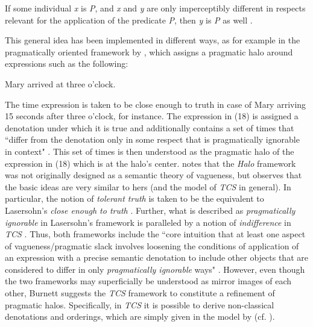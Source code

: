 \documentclass[output=paper]{langsci/langscibook}
\begin{document}
\ea
	If some individual \textit{x} is \textit{P}, and \textit{x} and \textit{y} are only imperceptibly different in respects relevant for the application of the predicate \textit{P}, then \textit{y} is \textit{P} as well \textcite[348]{Cobreros2012}.
\z

This general idea has been implemented in different ways, as for example in the pragmatically oriented framework by \citet{Lasersohn1999}, which assigns a pragmatic halo around expressions such as the following:

\ea
	Mary arrived at three o'clock.
\z

The time expression is taken to be close enough to truth in case of Mary arriving 15 seconds after three o'clock, for instance. The expression in (18) is assigned a denotation under which it is true and additionally contains a set of times that ``differ from the denotation only in some respect that is pragmatically ignorable in context" \textcite[526]{Lasersohn1999}. This set of times is then understood as the pragmatic halo of the expression in (18) which is at the halo's center. \textcite[29]{Burnett2017} notes that the \textit{Halo} framework was not originally designed as a semantic theory of vagueness, but observes that the basic ideas are very similar to hers (and the model of \textit{TCS} in general). In particular, the notion of \textit{tolerant truth} is taken to be the equivalent to Lasersohn's \textit{close enough to truth} \textcite[32]{Burnett2017}. Further, what is described as \textit{pragmatically ignorable} in Lasersohn's framework is paralleled by a notion of \textit{indifference} in \textit{TCS} \textcite[32]{Burnett2017}. Thus, both frameworks include the ``core intuition that at least one aspect of vagueness/pragmatic slack involves loosening the conditions of application of an expression with a precise semantic denotation to include other objects that are considered to differ in only \textit {pragmatically ignorable} ways" \textcite[32--33]{Burnett2017}. However, even though the two frameworks may superficially be understood as mirror images of each other, Burnett suggests the \textit{TCS} framework to constitute a refinement of pragmatic halos. Specifically, in \textit{TCS} it is possible to derive non-classical denotations and orderings, which are simply given in the model by \citet{Lasersohn1999} (cf. \citet[33]{Burnett2017}).
\end{document}
